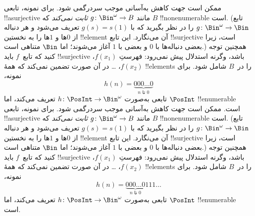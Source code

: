  {
  ممکن است جهت کاهش به‌آسانی موجب سردرگمی شود. برای نمونه، تابعی
  !!a{surjective} مانند $g \colon \Bin^\omega \to B$ \emph{ثابت نمی‌کند}
  که $B$ !!{nonenumerable} است. (تابع $g
  \colon \Bin^\omega \to \Bin$ را در نظر بگیرید که با $g(s) = s(1)$
  تعریف می‌شود و هر دنباله از $0$ها و $1$ها را به نخستین !!{element} آن
  می‌نگارد. این تابع !!{surjective} است، زیرا بعضی دنباله‌ها با $0$ و
  بعضی با $1$ آغاز می‌شوند؛ اما $\Bin$ متناهی است.) همچنین توجه کنید که
  تابع~$f$ باید !!{surjective} باشد، وگرنه استدلال پیش نمی‌رود:
  فهرستِ $f(x_1)$، $f(x_2)$، \dots{} در آن صورت تضمین نمی‌کند که همهٔ
  !!{element}s را در~$B$ شامل شود. برای نمونه،
  \[
  h(n) = \underbrace{000\dots0}_{\text{$n$ تا $0$}}
  \]
  تابعی به‌صورت $h\colon \PosInt \to
  \Bin^\omega$ تعریف می‌کند، اما $\PosInt$ !!{enumerable} است.
 }
 {
  ممکن است جهت کاهش به‌آسانی موجب سردرگمی شود. برای نمونه، تابعی
  !!a{surjective} مانند $g \colon \Bin^\omega \to B$ \emph{ثابت نمی‌کند}
  که $B$ !!{nonenumerable} است. (تابع $g
  \colon \Bin^\omega \to \Bin$ را در نظر بگیرید که با $g(s) = s(1)$
  تعریف می‌شود و هر دنباله از $0$ها و $1$ها را به نخستین !!{element} آن
  می‌نگارد. این تابع !!{surjective} است، زیرا بعضی دنباله‌ها با $0$ و
  بعضی با $1$ آغاز می‌شوند؛ اما $\Bin$ متناهی است.) همچنین توجه کنید که
  تابع~$f$ باید !!{surjective} باشد، وگرنه استدلال پیش نمی‌رود:
  فهرستِ $f(x_1)$، $f(x_2)$، \dots{} در آن صورت تضمین نمی‌کند که همهٔ
  !!{element}s را در~$B$ شامل شود. برای نمونه،
  \[
  h(n) = \underbrace{000\dots0}_{\text{$n$ تا $0$}}111\dots
  \]
  تابعی به‌صورت $h\colon \PosInt \to
  \Bin^\omega$ تعریف می‌کند، اما $\PosInt$ !!{enumerable} است.
 }


